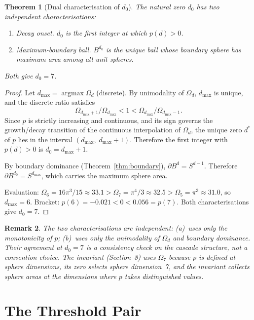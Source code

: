 \documentclass[11pt,a4paper]{article}
\newtheorem{theorem}{Theorem}[section]
\newtheorem{remark}[theorem]{Remark}
\begin{document}
\begin{theorem}[Dual characterisation of $d_0$]\label{thm:dual}
The natural zero $d_0$ has two independent characterisations:
\begin{enumerate}
\item[(a)] \emph{Decay onset.} $d_0$ is the first integer at which
$p(d) > 0$.
\item[(b)] \emph{Maximum-boundary ball.} $B^{d_0}$ is the unique ball
whose boundary sphere has maximum area among all unit spheres.
\end{enumerate}
Both give $d_0 = 7$.
\end{theorem}

\begin{proof}
Let $d_{\max} = \operatorname{argmax}\Omega_d$ (discrete). By
unimodality of $\Omega_d$, $d_{\max}$ is unique, and the discrete ratio
satisfies
\[
\Omega_{d_{\max}+1}/\Omega_{d_{\max}} < 1 < \Omega_{d_{\max}}/\Omega_{d_{\max}-1}.
\]
Since $p$ is strictly increasing and continuous, and its sign governs
the growth/decay transition of the continuous interpolation of $\Omega_d$,
the unique zero $d^*$ of $p$ lies in the interval
$(d_{\max},\;d_{\max}+1)$. Therefore the first integer with $p(d) > 0$ is
$d_0 = d_{\max} + 1$.

By boundary dominance (Theorem~\ref{thm:boundary}),
$\partial B^d = S^{d-1}$. Therefore
$\partial B^{d_0} = S^{d_{\max}}$, which carries the maximum sphere area.

Evaluation: $\Omega_6 = 16\pi^3/15\approx 33.1 > \Omega_7 = \pi^4/3
\approx 32.5 > \Omega_5 = \pi^3\approx 31.0$, so $d_{\max} = 6$.
Bracket: $p(6) = -0.021 < 0 < 0.056 = p(7)$. Both characterisations
give $d_0 = 7$.
\end{proof}

\begin{remark}\label{rem:convention}
The two characterisations are independent: (a)~uses only the
monotonicity of $p$; (b)~uses only the unimodality of $\Omega_d$ and
boundary dominance. Their agreement at $d_0 = 7$ is a consistency check
on the cascade structure, not a convention choice. The invariant
(Section~8) uses $\Omega_7$ because $p$ is defined at sphere dimensions,
its zero selects sphere dimension~7, and the invariant collects sphere
areas at the dimensions where $p$ takes distinguished values.
\end{remark}

\section{The Threshold Pair}\label{sec:the-threshold-pair}
\end{document}
